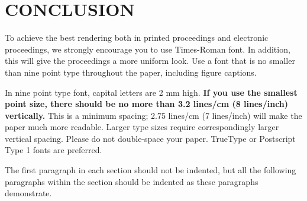 \documentclass{article}
\begin{document}


\section{CONCLUSION}
\label{sec:typestyle}




To achieve the best rendering both in printed proceedings and electronic proceedings, we
strongly encourage you to use Times-Roman font.  In addition, this will give
the proceedings a more uniform look.  Use a font that is no smaller than nine
point type throughout the paper, including figure captions.

In nine point type font, capital letters are 2 mm high.  {\bf If you use the
smallest point size, there should be no more than 3.2 lines/cm (8 lines/inch)
vertically.}  This is a minimum spacing; 2.75 lines/cm (7 lines/inch) will make
the paper much more readable.  Larger type sizes require correspondingly larger
vertical spacing.  Please do not double-space your paper.  TrueType or
Postscript Type 1 fonts are preferred.

The first paragraph in each section should not be indented, but all the
following paragraphs within the section should be indented as these paragraphs
demonstrate.





\vfill\pagebreak






\end{document}
